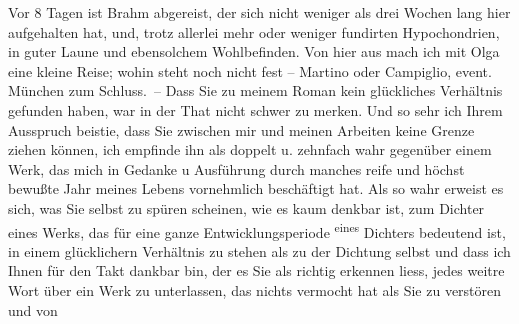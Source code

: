 \begin{ledgroupsized}[t]{13cm}
               Vor 8 Tagen ist Brahm abgereist, der sich
               nicht weniger als drei Wochen lang hier aufgehalten hat, und, trotz allerlei mehr
               oder weniger fundirten Hypochondrien, in guter Laune und ebensolchem
               Wohlbefinden.\pend
           \pstart
           Von hier aus mach ich mit Olga eine kleine
               Reise; wohin steht noch nicht fest – Martino
               oder Campiglio, event. München zum Schluss. – Dass Sie zu {\pb}meinem Roman kein
               glückliches Verhältnis gefunden haben, war in der That nicht schwer zu merken. Und so
               sehr ich Ihrem Ausspruch beisti{\geminationm}e, dass Sie zwischen mir
               und meinen Arbeiten keine Grenze ziehen können, ich empfinde ihn als doppelt u.
               zehnfach wahr gegenüber einem Werk, das mich in Gedanke u Ausführung durch manches
               reife und \introOben{}höchst\introOben{} bewußte Jahr meines Lebens vornehmlich
               beschäftigt hat. Als so wahr erweist es sich, was Sie selbst zu spüren scheinen, wie
               es kaum denkbar ist, zum Dichter eines Werks, das für eine {\pb}ganze Entwicklungsperiode \substVorne{}\textsuperscript{eines}\substDazwischen{}\label{T_L01786_1v}\label{T_L01786_1h}\substHinten{} Dichters bedeutend ist, in einem glücklichern Verhältnis zu stehen als zu
               der Dichtung selbst und dass ich Ihnen für den Takt dankbar bin, der es Sie als
               richtig erkennen liess, jedes weitre Wort über ein Werk zu unterlassen, das nichts vermocht hat als Sie zu verstören und von

\end{ledgroupsized}
